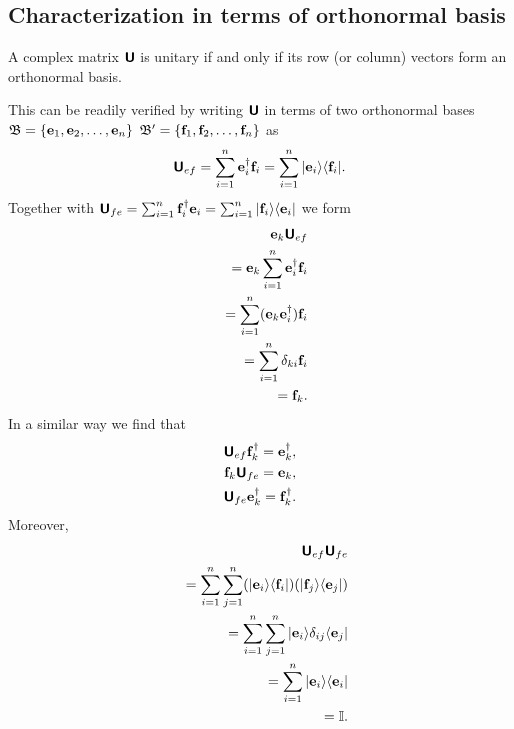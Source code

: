 \subsection {Characterization in terms of orthonormal basis}
\label{2012-m-ch-citoob}


A complex matrix $\textsf{\textbf{U}}$ is unitary if and only if its row (or column) vectors form
an orthonormal basis.

This can be readily verified \cite{Schwinger.60} by writing $\textsf{\textbf{U}}$
in terms of two orthonormal bases
${\frak B}=\{{\bf e}_1,  {\bf e}_2, \ldots , {\bf e}_n\}$
${\frak B}'=\{{\bf f}_1,  {\bf f}_2, \ldots , {\bf f}_n\}$ as
\begin{equation}
\textsf{\textbf{U}}_{ef}= \sum_{i=1}^n  {\bf e}_i^\dagger {\bf f}_i
=  \sum_{i=1}^n  \vert {\bf e}_i\rangle \langle {\bf f}_i \vert
.
\end{equation}
Together with $\textsf{\textbf{U}}_{fe}= \sum_{i=1}^n  {\bf f}_i^\dagger {\bf e}_i=  \sum_{i=1}^n  \vert {\bf f}_i\rangle \langle {\bf e}_i \vert $
we form
\begin{equation}
\begin{split}
{\bf e}_k \textsf{\textbf{U}}_{ef}\\
\quad = {\bf e}_k\sum_{i=1}^n  {\bf e}_i^\dagger {\bf f}_i \\
\quad
= \sum_{i=1}^n  ({\bf e}_k{\bf e}_i^\dagger) {\bf f}_i \\
\quad
= \sum_{i=1}^n  \delta_{ki} {\bf f}_i \\
\quad  = {\bf f}_k
.
\end{split}
\end{equation}
In a similar way we find that
\begin{equation}
\begin{split}
\textsf{\textbf{U}}_{ef} {\bf f}_k^\dagger = {\bf e}_k^\dagger,\\
{\bf f}_k\textsf{\textbf{U}}_{fe}   = {\bf e}_k,\\
\textsf{\textbf{U}}_{fe} {\bf e}_k^\dagger = {\bf f}_k^\dagger.
\end{split}
\end{equation}
Moreover,
\begin{equation}
\begin{split}
\textsf{\textbf{U}}_{ef}\textsf{\textbf{U}}_{fe}\\
\quad
=
 \sum_{i=1}^n  \sum_{j=1}^n
(\vert {\bf e}_i\rangle \langle {\bf f}_i \vert )
(\vert {\bf f}_j\rangle \langle {\bf e}_j \vert )\\
\quad
=
 \sum_{i=1}^n  \sum_{j=1}^n
\vert {\bf e}_i\rangle \delta_{ij} \langle {\bf e}_j \vert \\
\quad
=
 \sum_{i=1}^n
\vert {\bf e}_i\rangle   \langle {\bf e}_i \vert \\
\quad
=
{\Bbb I}
.
\end{split}
\end{equation}

